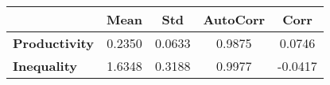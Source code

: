 \begin{tiny}\begin{tabular}{|l|c|c|c|c|}
\hline
&\textbf{Mean}&\textbf{Std}&\textbf{AutoCorr}&\textbf{Corr}\\\hline
\textbf{Productivity}&0.2350&0.0633&0.9875&0.0746\\\hline
\textbf{Inequality}&1.6348&0.3188&0.9977&-0.0417\\\hline
\end{tabular}
\end{tiny}